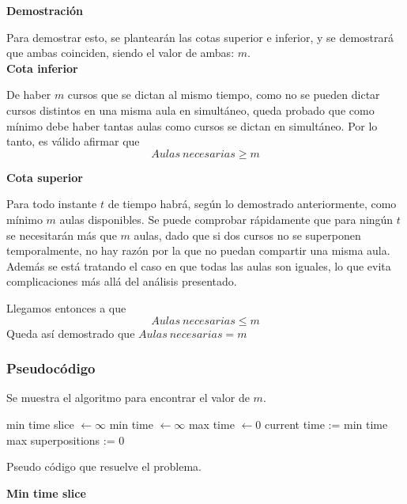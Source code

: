 \documentclass{article}
\begin{document}
\textbf{Demostración}\par
Para demostrar esto, se plantearán las cotas superior e inferior, y se demostrará que ambas coinciden, siendo el valor de ambas: $m$.\\

\textbf{Cota inferior}\par
De haber $m$ cursos que se dictan al mismo tiempo, como no se pueden dictar cursos distintos en una misma aula en simultáneo, queda probado que como mínimo debe haber tantas aulas como cursos se dictan en simultáneo. Por lo tanto, es válido afirmar que $$Aulas\ necesarias \geq m$$\par
\textbf{Cota superior}\par
Para todo instante $t$ de tiempo habrá, según lo demostrado anteriormente, como mínimo $m$ aulas disponibles. Se puede comprobar rápidamente que para ningún $t$ se necesitarán más que $m$ aulas, dado que si dos cursos no se superponen temporalmente, no hay razón por la que no puedan compartir una misma aula. Además se está tratando el caso en que todas las aulas son iguales, lo que evita complicaciones más allá del análisis presentado.

Llegamos entonces a que $$Aulas\ necesarias \leq m$$
Queda así demostrado que $Aulas\ necesarias = m$
\subsubsection{Pseudocódigo}
Se muestra el algoritmo para encontrar el valor de $m$.\\

\begin{algorithm}[H]
    \BlankLine
    min time slice $\leftarrow \infty$\;
    min time $\leftarrow \infty$\;
    max time $\leftarrow 0$\;
    \BlankLine
    current time := min time\;
    max superpositions := 0\;
\caption{Pseudo código que resuelve el problema.}
\end{algorithm}
\textbf{Min time slice}\\
\end{document}
